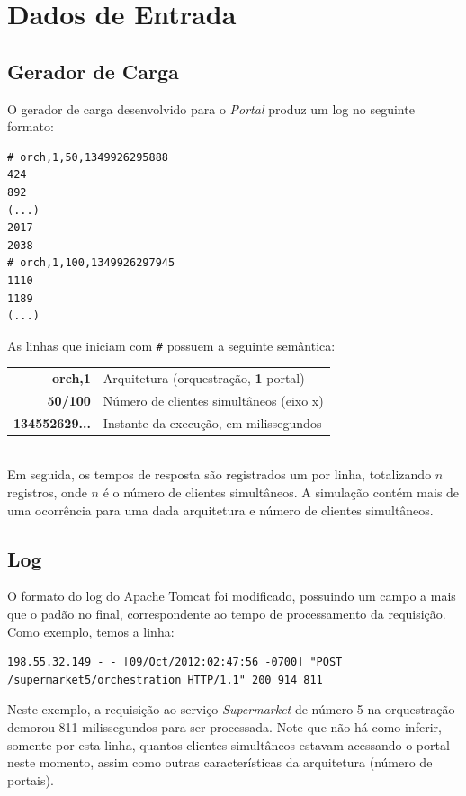 \documentclass[brazil, a4paper,12pt]{article}
\begin{document}
\section{Dados de Entrada}

\subsection{Gerador de Carga}
O gerador de carga desenvolvido para o \emph{Portal} produz um log no seguinte
formato:

\begin{verbatim}
# orch,1,50,1349926295888
424
892
(...)
2017
2038
# orch,1,100,1349926297945
1110
1189
(...)
\end{verbatim}

As linhas que iniciam com \verb/#/ possuem a seguinte semântica:\\

\begin{tabular}{r l}
  {\bf orch,1} & Arquitetura (orquestração, {\bf1} portal)\\
  {\bf 50/100} & Número de clientes simultâneos (eixo x)\\
  {\bf 134552629...} & Instante da execução, em milissegundos
\end{tabular}
\\

Em seguida, os tempos de resposta são registrados um por linha, totalizando $n$
registros, onde $n$ é o número de clientes simultâneos. A simulação contém mais
de uma ocorrência para uma dada arquitetura e número de clientes simultâneos.

\subsection{Log}
  O formato do log do Apache Tomcat foi modificado, possuindo um campo a mais
  que o padão no final, correspondente ao tempo de processamento da requisição.
  Como exemplo, temos a linha:

\begin{verbatim}
198.55.32.149 - - [09/Oct/2012:02:47:56 -0700] "POST
/supermarket5/orchestration HTTP/1.1" 200 914 811
\end{verbatim}

Neste exemplo, a requisição ao serviço \emph{Supermarket} de número 5 na
orquestração demorou 811 milissegundos para ser processada. Note que não há
como inferir, somente por esta linha, quantos clientes simultâneos estavam
acessando o portal neste momento, assim como outras características da
arquitetura (número de portais).
\end{document}
